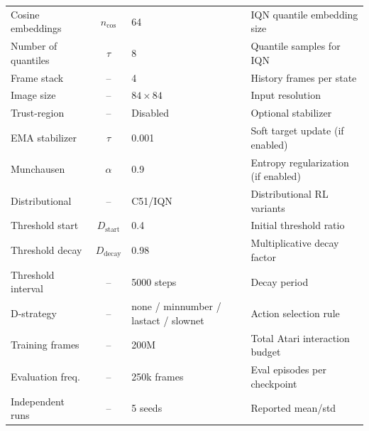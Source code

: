 \documentclass[11pt]{article}
\begin{document}
\begin{table}[htbp]
{\begin{tabular}{p{3cm} c p{3cm} p{7cm}}
Cosine embeddings    & $n_{\cos}$       & 64                        & IQN quantile embedding size \\
Number of quantiles  & $\tau$           & 8                         & Quantile samples for IQN \\
Frame stack          & --               & 4                         & History frames per state \\
Image size           & --               & $84 \times 84$            & Input resolution \\
Trust-region         & --               & Disabled                  & Optional stabilizer \\
EMA stabilizer       & $\tau$           & 0.001                     & Soft target update (if enabled) \\
Munchausen           & $\alpha$         & 0.9                       & Entropy regularization (if enabled) \\
Distributional       & --               & C51/IQN                   & Distributional RL variants \\
Threshold start      & $D_{\text{start}}$ & 0.4                     & Initial threshold ratio \\
Threshold decay      & $D_{\text{decay}}$ & 0.98                    & Multiplicative decay factor \\
Threshold interval   & --               & 5000 steps                & Decay period \\
D-strategy           & --               & none / minnumber / lastact / slownet & Action selection rule \\
Training frames      & --               & 200M                      & Total Atari interaction budget \\
Evaluation freq.     & --               & 250k frames               & Eval episodes per checkpoint \\
Independent runs     & --               & 5 seeds                   & Reported mean/std \\
\bottomrule
\end{tabular}
}
\end{table}
\end{document}
